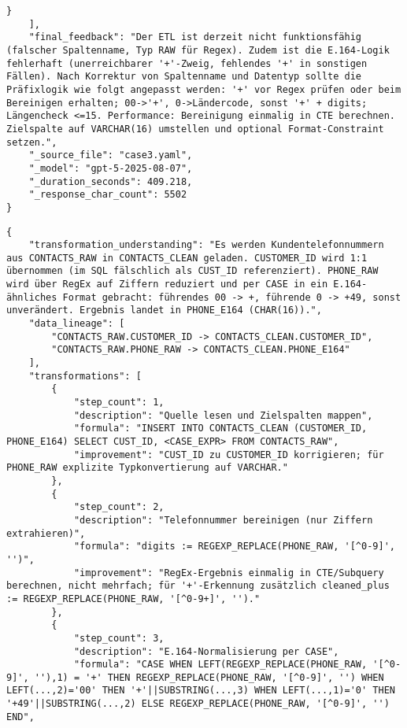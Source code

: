 \begin{lstlisting}[caption={Ausgabe: GPT-5 Anwendungsfall 3 Hauptdurchlauf},label={gpt_case3_prompt1}]
        }
    ],
    "final_feedback": "Der ETL ist derzeit nicht funktionsfähig (falscher Spaltenname, Typ RAW für Regex). Zudem ist die E.164-Logik fehlerhaft (unerreichbarer '+'-Zweig, fehlendes '+' in sonstigen Fällen). Nach Korrektur von Spaltenname und Datentyp sollte die Präfixlogik wie folgt angepasst werden: '+' vor Regex prüfen oder beim Bereinigen erhalten; 00->'+', 0->Ländercode, sonst '+' + digits; Längencheck <=15. Performance: Bereinigung einmalig in CTE berechnen. Zielspalte auf VARCHAR(16) umstellen und optional Format-Constraint setzen.",
    "_source_file": "case3.yaml",
    "_model": "gpt-5-2025-08-07",
    "_duration_seconds": 409.218,
    "_response_char_count": 5502
}
\end{lstlisting}

\begin{lstlisting}[caption={Ausgabe: GPT-5 Anwendungsfall 3 Konsistenzdurchlauf},label={gpt_case3_prompt2}]
{
    "transformation_understanding": "Es werden Kundentelefonnummern aus CONTACTS_RAW in CONTACTS_CLEAN geladen. CUSTOMER_ID wird 1:1 übernommen (im SQL fälschlich als CUST_ID referenziert). PHONE_RAW wird über RegEx auf Ziffern reduziert und per CASE in ein E.164-ähnliches Format gebracht: führendes 00 -> +, führende 0 -> +49, sonst unverändert. Ergebnis landet in PHONE_E164 (CHAR(16)).",
    "data_lineage": [
        "CONTACTS_RAW.CUSTOMER_ID -> CONTACTS_CLEAN.CUSTOMER_ID",
        "CONTACTS_RAW.PHONE_RAW -> CONTACTS_CLEAN.PHONE_E164"
    ],
    "transformations": [
        {
            "step_count": 1,
            "description": "Quelle lesen und Zielspalten mappen",
            "formula": "INSERT INTO CONTACTS_CLEAN (CUSTOMER_ID, PHONE_E164) SELECT CUST_ID, <CASE_EXPR> FROM CONTACTS_RAW",
            "improvement": "CUST_ID zu CUSTOMER_ID korrigieren; für PHONE_RAW explizite Typkonvertierung auf VARCHAR."
        },
        {
            "step_count": 2,
            "description": "Telefonnummer bereinigen (nur Ziffern extrahieren)",
            "formula": "digits := REGEXP_REPLACE(PHONE_RAW, '[^0-9]', '')",
            "improvement": "RegEx-Ergebnis einmalig in CTE/Subquery berechnen, nicht mehrfach; für '+'-Erkennung zusätzlich cleaned_plus := REGEXP_REPLACE(PHONE_RAW, '[^0-9+]', '')."
        },
        {
            "step_count": 3,
            "description": "E.164-Normalisierung per CASE",
            "formula": "CASE WHEN LEFT(REGEXP_REPLACE(PHONE_RAW, '[^0-9]', ''),1) = '+' THEN REGEXP_REPLACE(PHONE_RAW, '[^0-9]', '') WHEN LEFT(...,2)='00' THEN '+'||SUBSTRING(...,3) WHEN LEFT(...,1)='0' THEN '+49'||SUBSTRING(...,2) ELSE REGEXP_REPLACE(PHONE_RAW, '[^0-9]', '') END",

\end{lstlisting}
